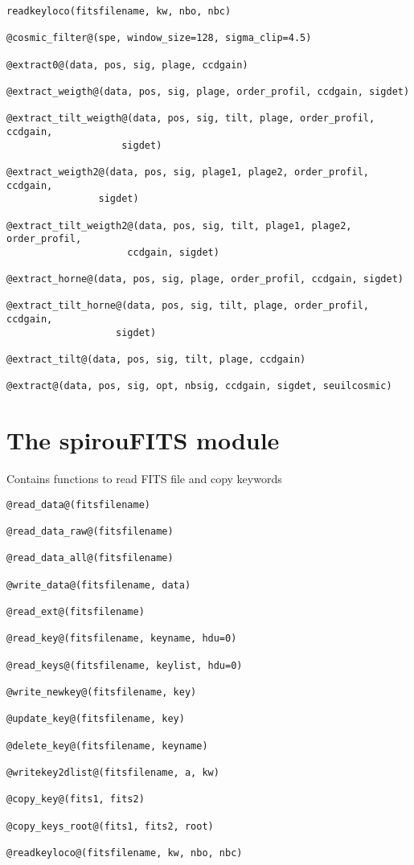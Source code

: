 \begin{lstlisting}[style=pythonstyle]
readkeyloco(fitsfilename, kw, nbo, nbc)

@cosmic_filter@(spe, window_size=128, sigma_clip=4.5)

@extract0@(data, pos, sig, plage, ccdgain)

@extract_weigth@(data, pos, sig, plage, order_profil, ccdgain, sigdet)

@extract_tilt_weigth@(data, pos, sig, tilt, plage, order_profil, ccdgain,
                    sigdet)

@extract_weigth2@(data, pos, sig, plage1, plage2, order_profil, ccdgain,
                sigdet)

@extract_tilt_weigth2@(data, pos, sig, tilt, plage1, plage2, order_profil,
                     ccdgain, sigdet)

@extract_horne@(data, pos, sig, plage, order_profil, ccdgain, sigdet)

@extract_tilt_horne@(data, pos, sig, tilt, plage, order_profil, ccdgain,
                   sigdet)

@extract_tilt@(data, pos, sig, tilt, plage, ccdgain)

@extract@(data, pos, sig, opt, nbsig, ccdgain, sigdet, seuilcosmic)
\end{lstlisting}

\clearpage
\newpage
\section{The spirouFITS module}

Contains functions to read FITS file and copy keywords

\begin{lstlisting}[style=pythonstyle]
@read_data@(fitsfilename)

@read_data_raw@(fitsfilename)

@read_data_all@(fitsfilename)

@write_data@(fitsfilename, data)

@read_ext@(fitsfilename)

@read_key@(fitsfilename, keyname, hdu=0)

@read_keys@(fitsfilename, keylist, hdu=0)

@write_newkey@(fitsfilename, key)

@update_key@(fitsfilename, key)

@delete_key@(fitsfilename, keyname)

@writekey2dlist@(fitsfilename, a, kw)

@copy_key@(fits1, fits2)

@copy_keys_root@(fits1, fits2, root)

@readkeyloco@(fitsfilename, kw, nbo, nbc)
\end{lstlisting}

